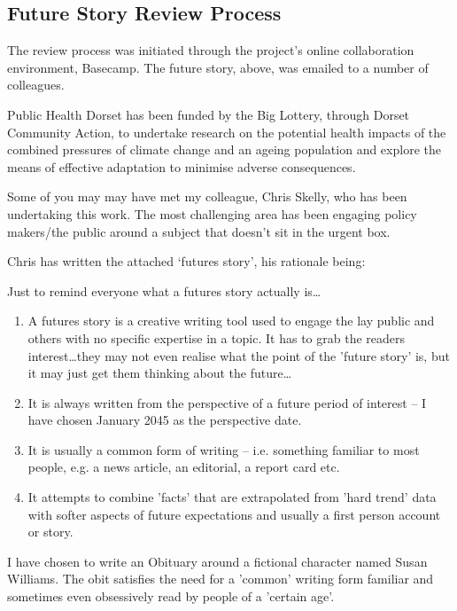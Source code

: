 \subsection{Future Story Review Process}
The review process was initiated through the project's online collaboration environment, Basecamp. The future story, above, was emailed to a number of colleagues.

Public Health Dorset has been funded by the Big Lottery, through Dorset Community Action, to undertake research on the potential health impacts of the combined pressures of climate change and an ageing population and explore the means of effective adaptation to minimise adverse consequences.

Some of you may may have met my colleague, Chris Skelly, who has been undertaking this work.  The most challenging area has been engaging policy makers/the public around a subject that doesn't sit in the urgent box.

Chris has written the attached `futures story', his rationale being:

Just to remind everyone what a futures story actually is\ldots

\begin{enumerate}
	\item A futures story is a creative writing tool used to engage the lay public and others with no specific expertise in a topic. It has to grab the readers interest\ldots they may not even realise what the point of the 'future story' is, but it may just get them thinking about the future\ldots
	\item It is always written from the perspective of a future period of interest -- I have chosen January 2045 as the perspective date.
	\item It is usually a common form of writing -- i.e. something familiar to most people, e.g. a news article, an editorial, a report card etc.
	\item It attempts to combine 'facts' that are extrapolated from 'hard trend' data with softer aspects of future expectations and usually a first person account or story.
\end{enumerate}

I have chosen to write an Obituary around a fictional character named Susan Williams. The obit satisfies the need for a 'common' writing form familiar and sometimes even obsessively read by people of a 'certain age'.

